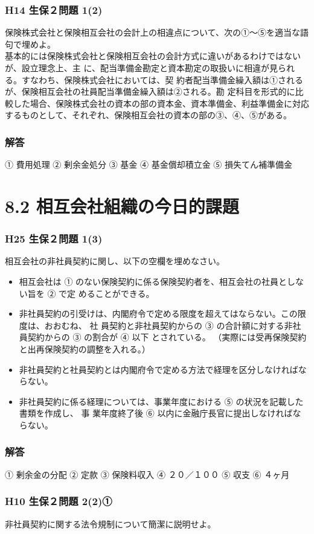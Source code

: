 \documentclass[report,gutter=10mm,fore-edge=10mm,uplatex,dvipdfmx]{jlreq}
\begin{document}
\subsubsection{H14 生保２問題 1(2)}
保険株式会社と保険相互会社の会計上の相違点について、次の①～⑤を適当な語句で埋めよ。\\
基本的には保険株式会社と保険相互会社の会計方式に違いがあるわけではないが、設立理念上、主
に、配当準備金勘定と資本勘定の取扱いに相違が見られる。すなわち、保険株式会社においては、契
約者配当準備金繰入額は①されるが、保険相互会社の社員配当準備金繰入額は②される。勘
定科目を形式的に比較した場合、保険株式会社の資本の部の資本金、資本準備金、利益準備金に対応
するものとして、それぞれ、保険相互会社の資本の部の③、④、⑤がある。
\subsubsection{解答}
① 費用処理 
② 剰余金処分 
③ 基金 
④ 基金償却積立金 
⑤ 損失てん補準備金 
\section{8.2 相互会社組織の今日的課題}
\subsubsection{H25 生保２問題 1(3)}
相互会社の非社員契約に関し、以下の空欄を埋めなさい。
\begin{itemize}
 \item 相互会社は ① のない保険契約に係る保険契約者を、相互会社の社員としない旨を
 ② で定 めることができる。
 \item  非社員契約の引受けは、内閣府令で定める限度を超えてはならない。この限度は、おおむね、
社 員契約と非社員契約からの ③
 の合計額に対する非社員契約からの ③ の割合が ④ 以下 とされている。
 （実際には受再保険契約と出再保険契約の調整を入れる。）
 \item  非社員契約と社員契約とは内閣府令で定める方法で経理を区分しなければならない。
 \item  非社員契約に係る経理については、事業年度における ⑤ の状況を記載した書類を作成し、
事 業年度終了後 ⑥ 以内に金融庁長官に提出しなければならない。
\end{itemize}
\subsubsection{解答}
① 剰余金の分配 ② 定款 ③ 保険料収入 ④ ２０／１００ ⑤ 収支 ⑥ ４ヶ月
\subsubsection{H10 生保２問題 2(2)①}
非社員契約に関する法令規制について簡潔に説明せよ。
\end{document}
